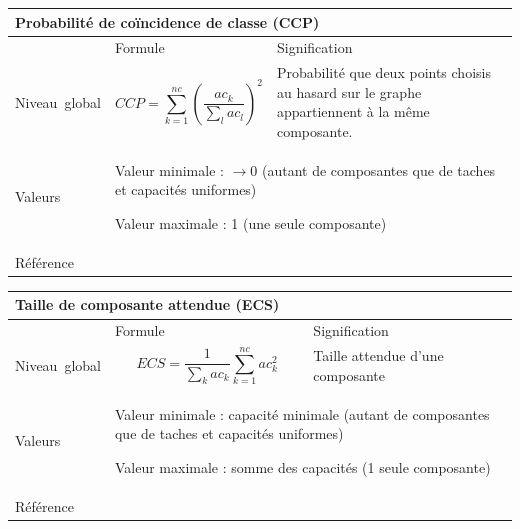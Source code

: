 \documentclass{article}
\begin{document}
\begin{table}[H]
\begin{tabular}{|m{3.24cm}|m{4.4810004cm}m{7.924cm}|}

\hline
\multicolumn{3}{|m{16.044998cm}|}{Probabilité de coïncidence de classe (CCP)}\\\hline
 &
\multicolumn{1}{m{4.4810004cm}|}{Formule} &
Signification\\\hline
Niveau~global &
\multicolumn{1}{m{4.4810004cm}|}{\begin{equation*}
\mathit{CCP}=\sum _{k=1}^{\mathit{nc}}{{\left(\frac{{\mathit{ac}}_{k}}{\sum _{l}{{\mathit{ac}}_{l}}}\right)}^{2}}
\end{equation*}
} &
Probabilité que deux points choisis au hasard sur le graphe appartiennent à la même composante.

\\\hline
Valeurs &
\multicolumn{2}{m{12.6050005cm}|}{Valeur minimale : $\rightarrow 0$ (autant de composantes que de taches et capacités uniformes)

Valeur maximale : 1 (une seule composante)

}\\\hline
Référence &
\multicolumn{2}{m{12.6050005cm}|}{\cite{Pascual2006}}\\\hline
\end{tabular}
\end{table}


\begin{table}[H]
\begin{tabular}{|m{3.24cm}|m{4.4810004cm}m{7.924cm}|}

\hline
\multicolumn{3}{|m{16.044998cm}|}{Taille de composante attendue (ECS)}\\\hline
 &
\multicolumn{1}{m{4.4810004cm}|}{Formule} &
Signification\\\hline
Niveau~global &
\multicolumn{1}{m{4.4810004cm}|}{\begin{equation*}
\mathit{ECS}=\frac{1}{\sum _{k}{{\mathit{ac}}_{k}}}\sum _{k=1}^{\mathit{nc}}{{{\mathit{ac}}_{k}^{2}}}
\end{equation*}
} &
Taille attendue d'une composante

\\\hline
Valeurs &
\multicolumn{2}{m{12.6050005cm}|}{Valeur minimale : capacité minimale (autant de composantes que de taches et capacités uniformes)

Valeur maximale : somme des capacités (1 seule composante)

}\\\hline
Référence &
\multicolumn{2}{m{12.6050005cm}|}{\cite{OBrien2006}}\\\hline
\end{tabular}
\end{table}
\end{document}
